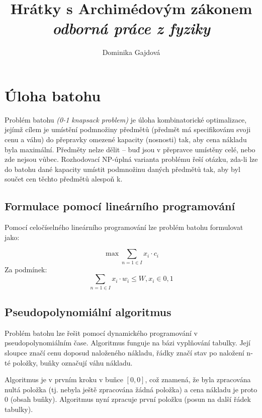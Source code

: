 \documentclass[titlepage, a4paper, 12pt]{article}
\begin{document}
\begin{titlepage}
   \author{Dominika Gajdová}
	\title{
		\Huge Hrátky s Archimédovým zákonem \\
		\vspace{2mm}
		\large\emph{odborná práce z fyziky}}
\maketitle
\frenchspacing
\vspace*{450pt}
\end{titlepage}
\newpage
\tableofcontents
\newpage
\section{Úloha batohu}
Problém batohu \textit{(0-1 knapsack problem)} je úloha kombinatorické optimalizace, jejímž cílem je umístění podmnožiny předmětů (předmět má specifikovánu svoji cenu a váhu) do přepravky omezené kapacity (nosnosti) tak, aby cena nákladu byla maximální. Předměty nelze dělit – buď jsou v přepravce umístěny celé, nebo zde nejsou vůbec. Rozhodovací NP-úplná varianta problému řeší otázku, zda-li lze do batohu dané kapacity umístit podmnožinu daných předmětů tak, aby byl součet cen těchto předmětů alespoň k.

\subsection{Formulace pomocí lineárního programování}
Pomocí celočíselného lineárního programování lze problém batohu formulovat jako:

$$\max \sum_{n=1 \in I} x_i \cdot c_i$$ 
Za podmínek: 
$$\sum_{n=1 \in I} x_i \cdot w_i \leq W, x_i \in {0,1}$$

\subsection{Pseudopolynomiální algoritmus}
Problém batohu lze řešit pomocí dynamického programování v pseudopolynomiálním čase. Algoritmus funguje na bázi vyplňování tabulky. Její sloupce značí cenu doposud naloženého nákladu, řádky značí stav po naložení n-té položky, buňky označují váhu nákladu.
\newline

Algoritmus je v prvním kroku v buňce $[0, 0]$, což znamená, že byla zpracována nultá položka (tj. nebyla ještě zpracována žádná položka) a cena nákladu je proto 0 (obsah buňky). Algoritmus nyní zpracuje první položku (posun na další řádek tabulky).
\newline
\end{document}
